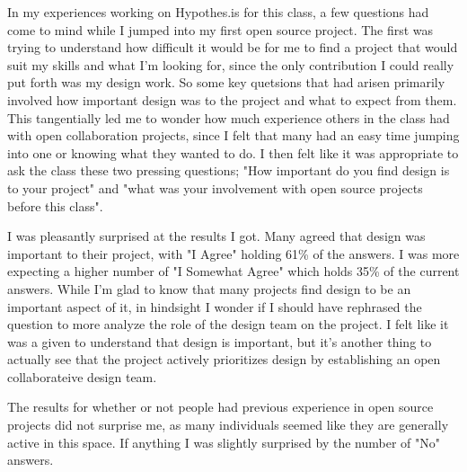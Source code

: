 In my experiences working on Hypothes.is for this class, a few questions had come to mind while I jumped into my first open source project. The first was trying to understand how difficult it would be for me to find a project that would suit my skills and what I'm looking for, since the only contribution I could really put forth was my design work. So some key quetsions that had arisen primarily involved how important design was to the project and what to expect from them. This tangentially led me to wonder how much experience others in the class had with open collaboration projects, since I felt that many had an easy time jumping into one or knowing what they wanted to do. I then felt like it was appropriate to ask the class these two pressing questions; "How important do you find design is to your project" and "what was your involvement with open source projects before this class". 

I was pleasantly surprised at the results I got. Many agreed that design was important to their project, with "I Agree" holding 61\% of the answers. I was more expecting a higher number of "I Somewhat Agree" which holds 35\% of the current answers. While I'm glad to know that many projects find design to be an important aspect of it, in hindsight I wonder if I should have rephrased the question to more analyze the role of the design team on the project. I felt like it was a given to understand that design is important, but it's another thing to actually see that the project actively prioritizes design by establishing an open collaborateive design team. 

The results for whether or not people had previous experience in open source projects did not surprise me, as many individuals seemed like they are generally active in this space. If anything I was slightly surprised by the number of "No" answers.

